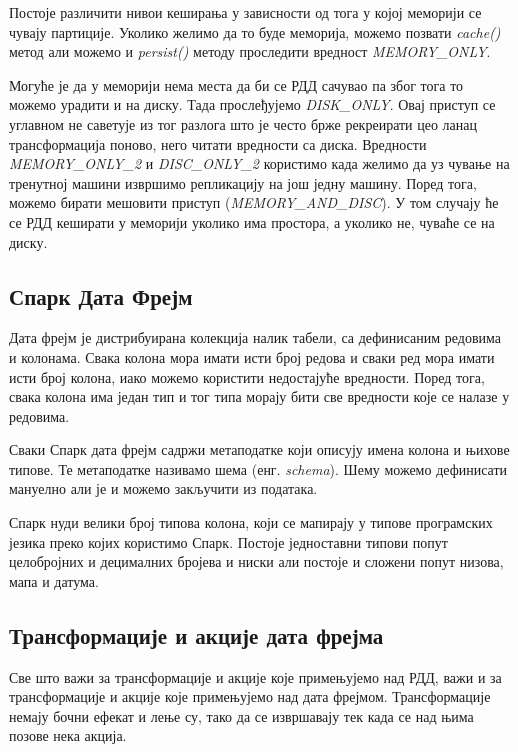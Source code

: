 \documentclass[12pt,oneside]{memoir}
\begin{document}
Постоје различити нивои кеширања у зависности од тога у којој меморији се чувају партиције. Уколико желимо да то буде меморија, можемо позвати \textit{cache()} метод али можемо и \textit{persist()} методу проследити вредност \textit{MEMORY\_ONLY}. 

Могуће је да у меморији нема места да би се РДД сачувао па због тога то можемо урадити и на диску. Тада прослеђујемо \textit{DISK\_ONLY}. Овај приступ се углавном не саветује из тог разлога што је често брже рекреирати цео ланац трансформација поново, него читати вредности са диска. Вредности \textit{MEMORY\_ONLY\_2} и \textit{DISC\_ONLY\_2} користимо када желимо да уз чување на тренутној машини извршимо репликацију на још једну машину. Поред тога, можемо бирати мешовити приступ (\textit{MEMORY\_AND\_DISC}). У том случају ће се РДД кеширати у меморији уколико има простора, а уколико не, чуваће се на диску. \cite{spark_rdd}

\subsection{Спарк Дата Фрејм}
\label{subsec:spark_df}

Дата фрејм је дистрибуирана колекција налик табели, са дефинисаним редовима и колонама. Свака колона мора имати исти број редова и сваки ред мора имати исти број колона, иако можемо користити недостајуће вредности. Поред тога, свака колона има један тип и тог типа морају бити све вредности које се налазе у редовима. \cite{spark_guide}

Сваки Спарк дата фрејм садржи метаподатке који описују имена колона и њихове типове. Те метаподатке називамо шема (енг. \textit{schema}). Шему можемо дефинисати мануелно али је и можемо закључити из података. \cite{spark_guide}

Спарк нуди велики број типова колона, који се мапирају у типове програмских језика преко којих користимо Спарк. Постоје једноставни типови попут целобројних и децималних бројева и ниски али постоје и сложени попут низова, мапа и датума. \cite{spark_guide}

\subsection{Трансформације и акције дата фрејма}
\label{subsec:spark_sql_ac_tr}

Све што важи за трансформације и акције које примењујемо над РДД, важи и за трансформације и акције које примењујемо над дата фрејмом. Трансформације немају бочни ефекат и лење су, тако да се извршавају тек када се над њима позове нека акција.
\end{document}
